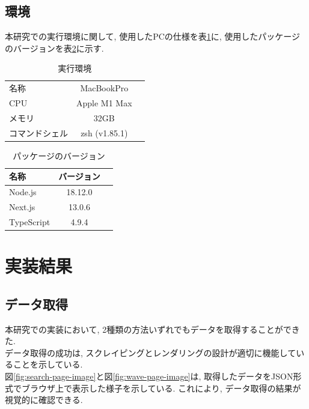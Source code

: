 \newpage

\subsection{環境}
本研究での実行環境に関して, 使用したPCの仕様を表\ref{table:zikkoukannkyo}に, 使用したパッケージのバージョンを表\ref{table:version}に示す. 

\begin{table}[hbtp]
	\caption{実行環境}
	\label{table:zikkoukannkyo}
	\centering
	\begin{tabular}{lcr}
		\hline
		名称      & MacBookPro    \\
		CPU     & Apple M1 Max  \\
		メモリ     & 32GB          \\
		コマンドシェル & zsh (v1.85.1) \\
		\hline
	\end{tabular}
\end{table}

\begin{table}[hbtp]
	\caption{パッケージのバージョン}
	\label{table:version}
	\centering
	\begin{tabular}{lcr}
		\hline
		名称         & バージョン   \\
		\hline \hline
		Node.js    & 18.12.0 \\
		Next.js    & 13.0.6  \\
		TypeScript & 4.9.4   \\
		\hline
	\end{tabular}
\end{table}


\section{実装結果}
\subsection{データ取得}
本研究での実装において, 2種類の方法いずれでもデータを取得することができた. \\
データ取得の成功は, スクレイピングとレンダリングの設計が適切に機能していることを示している. \\
図\ref{fig:search-page-image}と図\ref{fig:wave-page-image}は, 取得したデータをJSON形式でブラウザ上で表示した様子を示している. 
これにより, データ取得の結果が視覚的に確認できる. 

